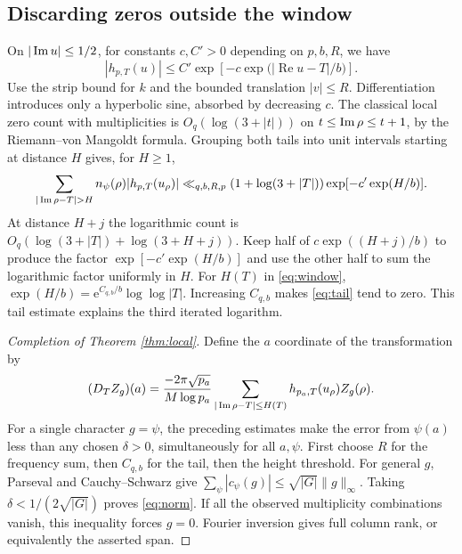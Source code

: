 \documentclass[11pt,letterpaper]{article}
\newcommand{\re}{\operatorname{Re}}\newcommand{\e}{\mathrm e}\newcommand{\dd}{\,\mathrm d}
\begin{document}
\subsection*{Discarding zeros outside the window}
On $|\operatorname{Im} u|\le1/2$, for constants $c,C'>0$ depending on $p,b,R$, we have
\begin{equation}
 |h_{p,T}(u)|\le C'\exp\!\left[-c\exp\bigl(|\re u-T|/b\bigr)\right].
 \label{eq:decay}
\end{equation}
Use the strip bound for $k$ and the bounded translation $|v|\le R$. Differentiation introduces only a hyperbolic sine, absorbed by decreasing $c$. The classical local zero count with multiplicities is $O_q(\log(3+|t|))$ on $t\le\operatorname{Im}\rho\le t+1$, by the Riemann--von Mangoldt formula. Grouping both tails into unit intervals starting at distance $H$ gives, for $H\ge1$,
\begin{equation}
 \sum_{|\imag\rho-T|>H}n_\psi(\rho)|h_{p,T}(u_\rho)|
 \ll_{q,b,R,p}(1+\log(3+|T|))\exp[-c'\exp(H/b)].
 \label{eq:tail}
\end{equation}
At distance $H+j$ the logarithmic count is $O_q(\log(3+|T|)+\log(3+H+j))$.
Keep half of $c\exp((H+j)/b)$ to produce the factor $\exp[-c'\exp(H/b)]$ and use the other half to sum the logarithmic factor uniformly in $H$. For $H(T)$ in \eqref{eq:window}, $\exp(H/b)=\e^{C_{q,b}/b}\log\log |T|$. Increasing $C_{q,b}$ makes \eqref{eq:tail} tend to zero. This tail estimate explains the third iterated logarithm.

\begin{proof}[Completion of Theorem \ref{thm:local}]
Define the $a$ coordinate of the transformation by
\[
 (D_T Z_g)(a)=\frac{-2\pi\sqrt{p_a}}{M\log p_a}
     \sum_{|\operatorname{Im}\rho-T|\le H(T)}h_{p_a,T}(u_\rho) Z_g(\rho).
\]
For a single character $g=\psi$, the preceding estimates make the error from $\psi(a)$ less than any chosen $\delta>0$, simultaneously for all $a,\psi$. First choose $R$ for the frequency sum, then $C_{q,b}$ for the tail, then the height threshold. For general $g$, Parseval and Cauchy--Schwarz give
$\sum_\psi|c_\psi(g)|\le\sqrt{|G|}\|g\|_\infty$. Taking $\delta<1/(2\sqrt{|G|})$ proves \eqref{eq:norm}. If all the observed multiplicity combinations vanish, this inequality forces $g=0$. Fourier inversion gives full column rank, or equivalently the asserted span.
\end{proof}
\end{document}
